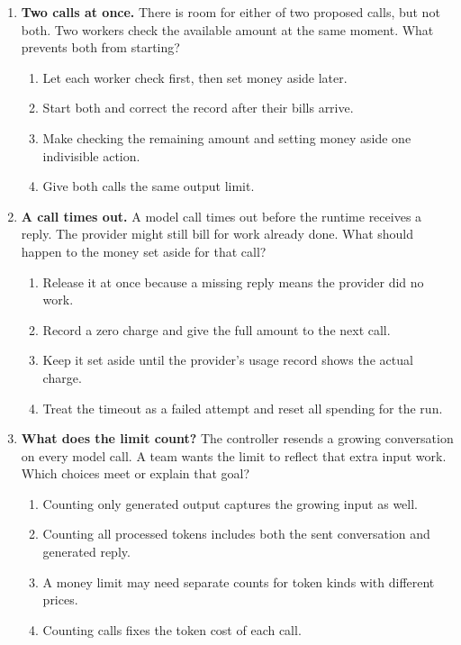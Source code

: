 \begin{enumerate}[start=51,itemsep=0.7\baselineskip]
\item\label{exercise:54} \begin{minipage}[t]{\linewidth}
\textbf{Two calls at once.} There is room for either of two proposed calls, but not both. Two workers check the available amount at the same moment. What prevents both from starting?
\begin{enumerate}[label=\textnormal{(\Alph*)},leftmargin=*,itemsep=0pt]
\item Let each worker check first, then set money aside later.
\item Start both and correct the record after their bills arrive.
\item Make checking the remaining amount and setting money aside one indivisible action.
\item Give both calls the same output limit.
\end{enumerate}
\end{minipage}

\item\label{exercise:55} \begin{minipage}[t]{\linewidth}
\textbf{A call times out.} A model call times out before the runtime receives a reply. The provider might still bill for work already done. What should happen to the money set aside for that call?
\begin{enumerate}[label=\textnormal{(\Alph*)},leftmargin=*,itemsep=0pt]
\item Release it at once because a missing reply means the provider did no work.
\item Record a zero charge and give the full amount to the next call.
\item Keep it set aside until the provider's usage record shows the actual charge.
\item Treat the timeout as a failed attempt and reset all spending for the run.
\end{enumerate}
\end{minipage}

\item\label{exercise:56} \begin{minipage}[t]{\linewidth}
\textbf{What does the limit count?} The controller resends a growing conversation on every model call. A team wants the limit to reflect that extra input work. Which choices meet or explain that goal?
\begin{enumerate}[label=\textnormal{(\Alph*)},leftmargin=*,itemsep=0pt]
\item Counting only generated output captures the growing input as well.
\item Counting all processed tokens includes both the sent conversation and generated reply.
\item A money limit may need separate counts for token kinds with different prices.
\item Counting calls fixes the token cost of each call.
\end{enumerate}
\end{minipage}


\end{enumerate}
